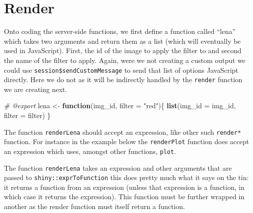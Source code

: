 \documentclass[
]{krantz}
\makeatletter
\newenvironment{Shaded}{\begin{snugshade}}{\end{snugshade}}
\newcommand{\CommentTok}[1]{\textcolor[rgb]{0.37,0.37,0.37}{\textit{#1}}}
\newcommand{\ControlFlowTok}[1]{\textcolor[rgb]{0.27,0.27,0.27}{\textbf{#1}}}
\newcommand{\DataTypeTok}[1]{\textcolor[rgb]{0.27,0.27,0.27}{#1}}
\newcommand{\KeywordTok}[1]{\textcolor[rgb]{0.27,0.27,0.27}{\textbf{#1}}}
\newcommand{\NormalTok}[1]{#1}
\newcommand{\OperatorTok}[1]{\textcolor[rgb]{0.43,0.43,0.43}{\textbf{#1}}}
\newcommand{\StringTok}[1]{\textcolor[rgb]{0.5,0.5,0.5}{#1}}
\newenvironment{kframe}{%
\medskip{}
\setlength{\fboxsep}{.8em}
 \def\at@end@of@kframe{}%
 \ifinner\ifhmode%
  \def\at@end@of@kframe{\end{minipage}}%
  \begin{minipage}{\columnwidth}%
 \fi\fi%
 \def\FrameCommand##1{\hskip\@totalleftmargin \hskip-\fboxsep
 \colorbox{shadecolor}{##1}\hskip-\fboxsep
     \hskip-\linewidth \hskip-\@totalleftmargin \hskip\columnwidth}%
 \MakeFramed {\advance\hsize-\width
   \@totalleftmargin\z@ \linewidth\hsize
   \@setminipage}}%
 {\par\unskip\endMakeFramed%
 \at@end@of@kframe}
\renewenvironment{Shaded}{\begin{kframe}}{\end{kframe}}
\makeatother
\begin{document}
\hypertarget{render}{%
\section*{Render}\label{render}}


Onto coding the server-side functions, we first define a function called ``lena'' which takes two arguments and return them as a list (which will eventually be used in JavaScript). First, the id of the image to apply the filter to and second the name of the filter to apply. Again, were we not creating a custom output we could use \texttt{session\$sendCustomMessage} to send that list of options JavaScript directly. Here we do not as it will be indirectly handled by the \texttt{render} function we are creating next.

\begin{Shaded}
\begin{Highlighting}[]
\CommentTok{\#\textquotesingle{} @export}
\NormalTok{lena \textless{}{-}}\StringTok{ }\ControlFlowTok{function}\NormalTok{(img\_id, }\DataTypeTok{filter =} \StringTok{"red"}\NormalTok{)\{}
  \KeywordTok{list}\NormalTok{(}\DataTypeTok{img\_id =}\NormalTok{ img\_id, }\DataTypeTok{filter =}\NormalTok{ filter)}
\NormalTok{\}}
\end{Highlighting}
\end{Shaded}

The function \texttt{renderLena} should accept an expression, like other such \texttt{render*} function. For instance in the example below the \texttt{renderPlot} function does accept an expression which uses, amongst other functions, \texttt{plot}.

\begin{Shaded}
\end{Shaded}

The function \texttt{renderLena} takes an expression and other arguments that are passed to \texttt{shiny::exprToFunction} this does pretty much what it says on the tin: it returns a function from an expression (unless that expression is a function, in which case it returns the expression). This function must be further wrapped in another as the render function must itself return a function.
\end{document}

